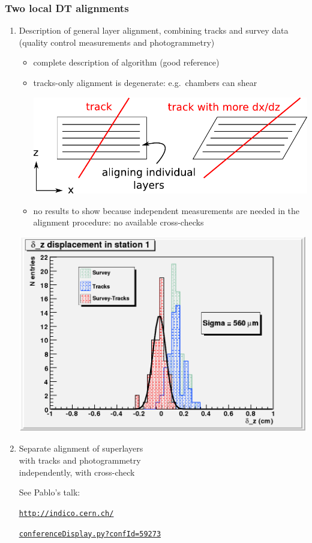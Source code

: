 \documentclass[compress]{beamer}
\begin{document}
\begin{frame}
\frametitle{Two local DT alignments}

\begin{enumerate}
\item Description of general layer alignment, combining tracks and survey data (quality control measurements and photogrammetry)
\begin{itemize}
\item complete description of algorithm (good reference)
\item tracks-only alignment is degenerate: e.g.\ chambers can shear
\begin{center}
\includegraphics[width=0.65\linewidth]{shear.pdf}
\end{center}
\item no results to show because independent measurements are needed in the alignment procedure: no available cross-checks
\end{itemize}

\hfill \includegraphics[width=0.5\linewidth]{dtinternal_crosscheck.png}

\vspace{-3 cm}
\item Separate alignment of superlayers \\ with tracks and photogrammetry \\ independently, with cross-check

{\scriptsize See Pablo's talk:}

\vspace{-0.1 cm}
\textcolor{blue}{\tt \tiny \underline{\href{http://indico.cern.ch/conferenceDisplay.py?confId=59273}{http://indico.cern.ch/}}}

\vspace{-0.2 cm}
\hspace{1 cm} \textcolor{blue}{\tt \tiny \underline{\href{http://indico.cern.ch/conferenceDisplay.py?confId=59273}{conferenceDisplay.py?confId=59273}}}

\end{enumerate}
\end{frame}
\end{document}
